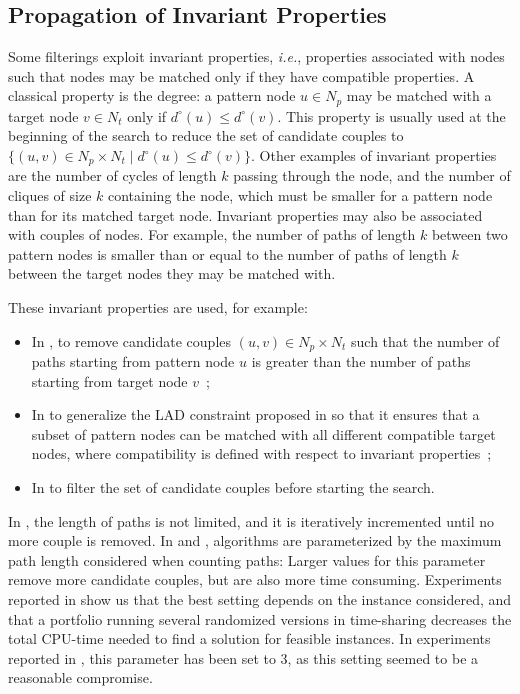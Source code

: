 \documentclass{llncs}
\begin{document}
\subsection{Propagation of Invariant Properties}

Some filterings exploit invariant properties, {\em i.e.}, properties associated with nodes such that nodes may be matched only if they have compatible properties. A classical property is the degree: a pattern node $u\in N_p$ may be matched with a target node $v\in N_t$ only if $d^\circ(u)\leq d^\circ(v)$. This property is usually used at the beginning of the search to reduce the set of candidate couples to $\{(u,v)\in N_p\times N_t\;|\;d^\circ(u)\leq d^\circ(v)\}$.
Other examples of invariant properties are the number of cycles of length $k$ passing through the node, and the number of cliques of size $k$ containing the node, which must be smaller for a pattern node than for its matched target node.
Invariant properties may also be associated with couples of nodes. For example, the number of paths of length $k$ between two pattern nodes is smaller than or equal to the number of paths of length $k$ between the target nodes they may be matched with. 

These invariant properties are used, for example:
\begin{itemize}
\item  In \cite{battiti-mascia07}, to remove candidate couples $(u,v)\in N_p\times N_t$ such that the number of paths starting from  pattern node $u$ is greater than the number of paths starting from  target node $v$~;
\item In \cite{Audemard:2014} to generalize the LAD constraint proposed in \cite{Solnon:2010} so that it ensures that a subset of pattern nodes can be matched with all different compatible target nodes, where compatibility is defined with respect to invariant properties~;
\item In \cite{McCreesh:2015} to filter the set of candidate couples before starting the search.
\end{itemize}
In \cite{Audemard:2014} , the length of paths is not limited, and it is iteratively incremented until no more couple is removed. In \cite{battiti-mascia07} and \cite{McCreesh:2015},  algorithms are parameterized by the maximum path length considered when counting paths: Larger values for this parameter remove more candidate couples, but are also more time consuming. Experiments reported in \cite{battiti-mascia07} show us that the best setting depends on the instance considered, and that a portfolio running several randomized 
versions in time-sharing decreases the total CPU-time needed to find a solution for feasible instances. In experiments reported in \cite{McCreesh:2015}, this parameter has been set to 3, as this setting seemed to be a reasonable compromise.
\end{document}
